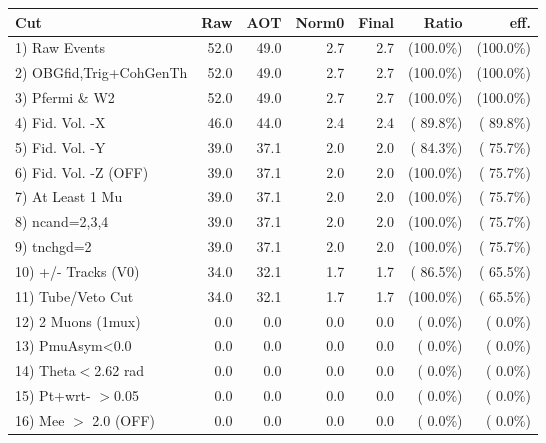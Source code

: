  \begin{table}[h!]\centering
 \begin{tabular}{||l||r|r|r|r|r|r||}
 \hline
 \hline
 Cut & Raw & AOT & Norm0 & Final & Ratio & eff.       \\
 \hline
  1) Raw Events           &         52.0 &         49.0 &          2.7 &          2.7 & (100.0\%) & (100.0\%) \\
  2) OBGfid,Trig+CohGenTh &         52.0 &         49.0 &          2.7 &          2.7 & (100.0\%) & (100.0\%) \\
  3) Pfermi \& W2         &         52.0 &         49.0 &          2.7 &          2.7 & (100.0\%) & (100.0\%) \\
  4) Fid. Vol. -X         &         46.0 &         44.0 &          2.4 &          2.4 & ( 89.8\%) & ( 89.8\%) \\
  5) Fid. Vol. -Y         &         39.0 &         37.1 &          2.0 &          2.0 & ( 84.3\%) & ( 75.7\%) \\
  6) Fid. Vol. -Z (OFF)   &         39.0 &         37.1 &          2.0 &          2.0 & (100.0\%) & ( 75.7\%) \\
  7) At Least 1 Mu        &         39.0 &         37.1 &          2.0 &          2.0 & (100.0\%) & ( 75.7\%) \\
  8) ncand=2,3,4          &         39.0 &         37.1 &          2.0 &          2.0 & (100.0\%) & ( 75.7\%) \\
  9) tnchgd=2             &         39.0 &         37.1 &          2.0 &          2.0 & (100.0\%) & ( 75.7\%) \\
 10) +/- Tracks (V0)      &         34.0 &         32.1 &          1.7 &          1.7 & ( 86.5\%) & ( 65.5\%) \\
 11) Tube/Veto Cut        &         34.0 &         32.1 &          1.7 &          1.7 & (100.0\%) & ( 65.5\%) \\
 12) 2 Muons (1mux)       &          0.0 &          0.0 &          0.0 &          0.0 & (  0.0\%) & (  0.0\%) \\
 13) PmuAsym<0.0          &          0.0 &          0.0 &          0.0 &          0.0 & (  0.0\%) & (  0.0\%) \\
 14) Theta$<$2.62 rad     &          0.0 &          0.0 &          0.0 &          0.0 & (  0.0\%) & (  0.0\%) \\
 15) Pt+wrt- $>$0.05      &          0.0 &          0.0 &          0.0 &          0.0 & (  0.0\%) & (  0.0\%) \\
 16) Mee $>$ 2.0  (OFF)   &          0.0 &          0.0 &          0.0 &          0.0 & (  0.0\%) & (  0.0\%) \\

\end{tabular}
\end{table}
